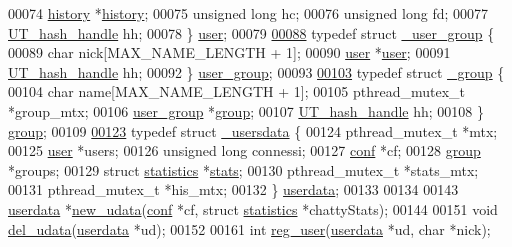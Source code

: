 \begin{DoxyCode}
00074   \mbox{\hyperlink{struct__history}{history}} *\mbox{\hyperlink{struct__history}{history}};
00075   \textcolor{keywordtype}{unsigned} \textcolor{keywordtype}{long} hc;
00076   \textcolor{keywordtype}{unsigned} \textcolor{keywordtype}{long} fd;
00077   \mbox{\hyperlink{structUT__hash__handle}{UT\_hash\_handle}} hh;
00078 \} \mbox{\hyperlink{struct__user}{user}};
00079 
\mbox{\hyperlink{struct__user__group}{00088}} \textcolor{keyword}{typedef} \textcolor{keyword}{struct }\mbox{\hyperlink{struct__user__group}{\_user\_group}} \{
00089   \textcolor{keywordtype}{char} nick[MAX\_NAME\_LENGTH + 1];
00090   \mbox{\hyperlink{struct__user}{user}} *\mbox{\hyperlink{struct__user}{user}};
00091   \mbox{\hyperlink{structUT__hash__handle}{UT\_hash\_handle}} hh;
00092 \} \mbox{\hyperlink{struct__user__group}{user\_group}};
00093 
\mbox{\hyperlink{struct__group}{00103}} \textcolor{keyword}{typedef} \textcolor{keyword}{struct }\mbox{\hyperlink{struct__group}{\_group}} \{
00104   \textcolor{keywordtype}{char} name[MAX\_NAME\_LENGTH + 1];
00105   pthread\_mutex\_t *group\_mtx;
00106   \mbox{\hyperlink{struct__user__group}{user\_group}} *\mbox{\hyperlink{struct__group}{group}};
00107   \mbox{\hyperlink{structUT__hash__handle}{UT\_hash\_handle}} hh;
00108 \} \mbox{\hyperlink{struct__group}{group}};
00109 
\mbox{\hyperlink{struct__usersdata}{00123}} \textcolor{keyword}{typedef} \textcolor{keyword}{struct }\mbox{\hyperlink{struct__usersdata}{\_usersdata}} \{
00124   pthread\_mutex\_t *mtx;
00125   \mbox{\hyperlink{struct__user}{user}} *users;
00126   \textcolor{keywordtype}{unsigned} \textcolor{keywordtype}{long} connessi;
00127   \mbox{\hyperlink{structconf}{conf}} *cf;
00128   \mbox{\hyperlink{struct__group}{group}} *groups;
00129   \textcolor{keyword}{struct }\mbox{\hyperlink{structstatistics}{statistics}} *\mbox{\hyperlink{user_8h_a21a1f4faff772a417f2f48bf45bcc89c}{stats}};
00130   pthread\_mutex\_t *stats\_mtx;
00131   pthread\_mutex\_t *his\_mtx;
00132 \} \mbox{\hyperlink{struct__usersdata}{userdata}};
00133 
00134 
00143 \mbox{\hyperlink{struct__usersdata}{userdata}} *\mbox{\hyperlink{user_8h_a22092737cd5a0895c1f57e90c786b83f}{new\_udata}}(\mbox{\hyperlink{structconf}{conf}} *cf, \textcolor{keyword}{struct} \mbox{\hyperlink{structstatistics}{statistics}} *chattyStats);
00144 
00151 \textcolor{keywordtype}{void} \mbox{\hyperlink{user_8h_a2b5d2bb28b9c95159ae4c9650bd1bbfc}{del\_udata}}(\mbox{\hyperlink{struct__usersdata}{userdata}} *ud);
00152 
00161 \textcolor{keywordtype}{int} \mbox{\hyperlink{user_8h_a0b3da9bc8bad80b9e45aabffbf47ffbd}{reg\_user}}(\mbox{\hyperlink{struct__usersdata}{userdata}} *ud, \textcolor{keywordtype}{char} *nick);

\end{DoxyCode}

